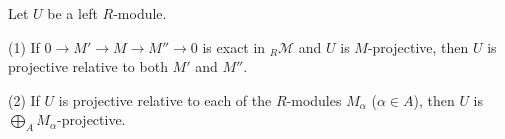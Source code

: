 Let $U$ be a left $R$-module.

(1) If $0 \to M' \to M \to M'' \to 0$ is exact in ${}_R\mathcal{M}$ and $U$ is $M$-projective, then $U$ is projective relative to both $M'$ and $M''$.

(2) If $U$ is projective relative to each of the $R$-modules $M_\alpha$ ($\alpha \in A$), then $U$ is $\bigoplus_A M_\alpha$-projective.
